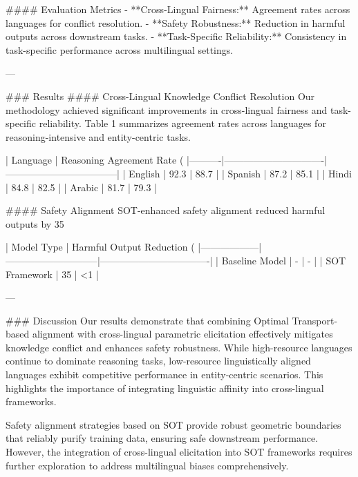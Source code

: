 #### Evaluation Metrics  
- **Cross-Lingual Fairness:** Agreement rates across languages for conflict resolution.  
- **Safety Robustness:** Reduction in harmful outputs across downstream tasks.  
- **Task-Specific Reliability:** Consistency in task-specific performance across multilingual settings.

---

### Results  
#### Cross-Lingual Knowledge Conflict Resolution  
Our methodology achieved significant improvements in cross-lingual fairness and task-specific reliability. Table 1 summarizes agreement rates across languages for reasoning-intensive and entity-centric tasks.

| Language | Reasoning Agreement Rate (%
|----------|-------------------------------|-----------------------------------|  
| English  | 92.3                         | 88.7                             |  
| Spanish  | 87.2                         | 85.1                             |  
| Hindi    | 84.8                         | 82.5                             |  
| Arabic   | 81.7                         | 79.3                             |  

#### Safety Alignment  
SOT-enhanced safety alignment reduced harmful outputs by 35%

| Model Type       | Harmful Output Reduction (%
|------------------|-----------------------------|----------------------------------|  
| Baseline Model   | -                           | -                                |  
| SOT Framework    | 35                          | <1                               |  

---

### Discussion  
Our results demonstrate that combining Optimal Transport-based alignment with cross-lingual parametric elicitation effectively mitigates knowledge conflict and enhances safety robustness. While high-resource languages continue to dominate reasoning tasks, low-resource linguistically aligned languages exhibit competitive performance in entity-centric scenarios. This highlights the importance of integrating linguistic affinity into cross-lingual frameworks.

Safety alignment strategies based on SOT provide robust geometric boundaries that reliably purify training data, ensuring safe downstream performance. However, the integration of cross-lingual elicitation into SOT frameworks requires further exploration to address multilingual biases comprehensively.

